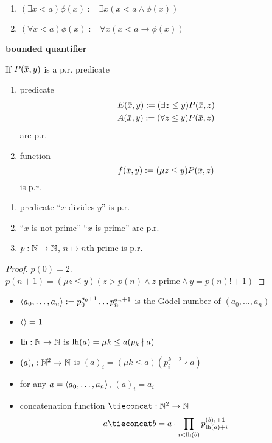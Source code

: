 \documentclass[11pt]{article}
\begin{document}
\begin{definition}[]
\begin{enumerate}
\item \((\exists x<a)\phi(x):=\exists x(x<a\wedge\phi(x))\)
\item \((\forall x<a)\phi(x):=\forall x(x<a\to\phi(x))\)
\end{enumerate}


\textbf{bounded quantifier}
\end{definition}

\begin{lemma}[]
If \(P(\barx,y)\) is a p.r. predicate
\begin{enumerate}
\item predicate
\begin{align*}
&E(\barx,y):=(\exists z\le y)P(\barx,z)\\
&A(\barx,y):=(\forall z\le y)P(\barx,z)
\end{align*}
are p.r.
\item function
\begin{equation*}
f(\barx,y):=(\mu z\le y)P(\barx,z)
\end{equation*}
is p.r.
\end{enumerate}
\end{lemma}

\begin{lemma}[]
\begin{enumerate}
\item predicate ``\(x\) divides \(y\)'' is p.r.
\item ``\(x\) is not prime'' ``\(x\) is prime'' are p.r.
\item \(p:\mathbb{N}\to\mathbb{N}\), \(n\mapsto n\text{th prime}\) is p.r.
\end{enumerate}
\end{lemma}

\begin{proof}
\(p(0)=2\). \(p(n+1)=(\mu z\le y)(z>p(n)\wedge z\text{ prime}\wedge y=p(n)!+1)\)
\end{proof}

\begin{itemize}
\item \(\langle a_0,\dots,a_n\rangle:=p_0^{a_0+1}\dots p_n^{a_{n}+1}\)  is the Gödel number of \((a_0,\dots,a_n)\)
\item \(\langle\rangle=1\)
\item \(\operatorname{lh}:\mathbb{N}\to\mathbb{N}\) is \(\operatorname{lh}(a)=\mu k\le a(p_k\nmid a)\)
\item \((a)_i:\mathbb{N}^2\to\mathbb{N}\) is \((a)_i=(\mu k\le a)(p_i^{k+2}\nmid a)\)
\item for any \(a=\langle a_0,\dots,a_n\rangle\), \((a)_i=a_i\)
\item concatenation function \(\tieconcat:\N^2\to\N\)
\begin{equation*}
a\tieconcat b=a\cdot\prod_{i<\lh(b)}p_{\lh(a)+i}^{(b)_i+1}
\end{equation*}
\end{itemize}
\end{document}
